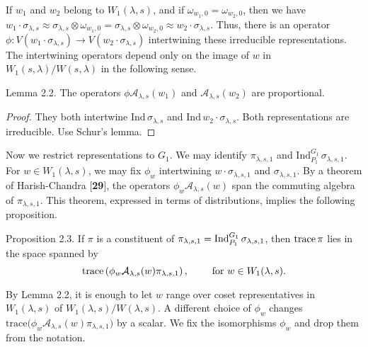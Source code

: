 \documentclass{amsart}
\begin{document}
If 
  $ w_1 $ and 
  $ w_2$ belong to $W_1 (\lambda,s) $,
and if
  $ \omega_{w_1,0} =
    \omega_{w_2,0} $,
then we have
  $ w_1 \cdot 
    \sigma_{\lambda,s} \approx
    \sigma_{\lambda,s} \otimes
    \omega_{w_1,0} =
    \sigma_{\lambda,s} \otimes
    \omega_{w_2,0} \approx
    w_2 \cdot 
    \sigma_{\lambda,s} $.
Thus, there is an operator 
  $ \phi : 
    V
    (w_1 \cdot \sigma_{\lambda,s})
    \to
    V(w_2 \cdot \sigma_{\lambda,s}) $
intertwining these irreducible representations.
The intertwining operators depend only on the image of $w$
in 
  $ W_1(s,\lambda) /
    W (s,\lambda) $
in the following sense.

\proclaim Lemma {2.2}.
The operators
  $ \phi {\mathcal A}_{\lambda,s} (w_1) $
and
  $ {\mathcal A}_{\lambda,s} (w_2) $
are proportional.
\finishproclaim

\begin{proof}
They both intertwine
  $ \text{Ind}\, \sigma_{\lambda,s} $
and
  $ \text{Ind}\, w_2 \cdot \sigma_{\lambda,s} $.
Both representations are irreducible.
Use Schur's lemma.
\end{proof}

Now we restrict representations to
  $ G_1 $.
We may identify
  $ \pi_{\lambda,s,1} $
and
  $ \text{Ind}_{P_1}^{G_1} \,
     \sigma_{\lambda,s,1} $.
For
  $ w \in W_1 (\lambda,s) $,
we may fix
  $ \phi_w $
intertwining
  $ w \cdot \sigma_{\lambda,s,1} $
and
  $ \sigma_{\lambda,s,1} $.
By a theorem of Harish-Chandra [{\bf 29}],
the operators
  $ \phi_w {\mathcal A}_{\lambda,s} (w) $
span the commuting algebra of 
  $ \pi_{\lambda,s,1} $.
This theorem, expressed in terms of distributions,
implies the following proposition.

\proclaim Proposition {2.3}.
If 
  $ \pi $
is a constituent of
  $ \pi_{\lambda,s,1} =
    \text{{\rm Ind}}_{P_1}^{G_1} \,
    \sigma_{\lambda,s,1} $,
then 
  $ \text{{\rm trace}}\,\pi $
lies in the space spanned by
%
$$
  \text{{\rm trace}} 
  \left(
    \phi_w 
    {\mathcal A}_{\lambda,s} (w)
    \pi_{\lambda,s,1}
  \right), \qquad\text{ for }
   w \in W_1(\lambda,s).
$$
%
\finishproclaim

By Lemma 2.2,
it is enough to let $w$ range over coset representatives in
  $ W_1(\lambda,s)  $
of
  $ W_1(\lambda,s) / W (\lambda,s) $.
A different choice of 
  $ \phi_w $
changes 
  $ \text{trace}
    \bigl(
       \phi_w
       {\mathcal A}_{\lambda,s} (w) 
       \pi_{\lambda,s,1} 
    \bigr) $
by a scalar.
We fix the isomorphisms
  $ \phi_w $
and drop them from the notation.
\end{document}
